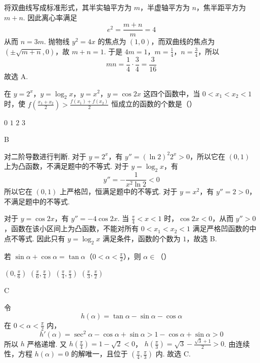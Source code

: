 \begin{solution}
将双曲线写成标准形式，其半实轴平方为 \(m\)，半虚轴平方为 \(n\)，焦半距平方为 \(m+n\). 因此离心率满足
\[
e^2=\frac{m+n}{m}=4
\]
从而 \(n=3m\). 抛物线 \(y^2=4x\) 的焦点为 \((1,0)\)，而双曲线的焦点为 \(\left(\pm\sqrt{m+n},0\right)\)，故 \(m+n=1\). 于是 \(4m=1\)，\(m=\frac14\)，\(n=\frac34\)，所以
\[
mn=\frac14\cdot\frac34=\frac{3}{16}
\]
故选 A.
\end{solution}

\begin{problem}
在 \( y = 2^x \)，\( y = \log_{2} x \)，\( y = x^2 \)，\( y = \cos 2x \) 这四个函数中，当 \( 0 < x_1 < x_2 < 1 \) 时，使 \( f\left(\frac{x_1 + x_2}{2}\right) > \frac{f(x_1) + f(x_2)}{2} \) 恒成立的函数的个数是（\quad）

\choices
    {\(0\)}
    {\(1\)}
    {\(2\)}
    {\(3\)}
\end{problem}

\begin{answer}
B
\end{answer}

\begin{solution}
对二阶导数进行判断. 对于 \(y=2^x\)，有 \(y''=(\ln2)^2 2^x>0\)，所以它在 \((0,1)\) 上为凸函数，不满足题中的不等式. 对于 \(y=\log_2x\)，有
\[
y''=-\frac{1}{x^2\ln2}<0
\]
所以它在 \((0,1)\) 上严格凹，恒满足题中的不等式. 对于 \(y=x^2\)，有 \(y''=2>0\)，不满足题中的不等式.

对于 \(y=\cos2x\)，有 \(y''=-4\cos2x\). 当 \(\frac{\pi}{4}<x<1\) 时，\(\cos2x<0\)，从而 \(y''>0\)，函数在该小区间上为凸函数，不能对所有 \(0<x_1<x_2<1\) 满足严格凹函数的中点不等式. 因此只有 \(y=\log_2x\) 满足条件，函数的个数为 \(1\)，故选 B.
\end{solution}

\begin{problem}
若 \(\sin \alpha + \cos \alpha = \tan \alpha\)（\(0 < \alpha < \frac{\pi}{2}\)），则 \(\alpha \in\)（\quad）

\choices
    {\(\left(0, \frac{\pi}{6}\right)\)}
    {\(\left(\frac{\pi}{6}, \frac{\pi}{4}\right)\)}
    {\(\left(\frac{\pi}{4}, \frac{\pi}{3}\right)\)}
    {\(\left(\frac{\pi}{3}, \frac{\pi}{2}\right)\)}
\end{problem}

\begin{answer}
C
\end{answer}

\begin{solution}
令
\[
h(\alpha)=\tan\alpha-\sin\alpha-\cos\alpha
\]
在 \(0<\alpha<\frac{\pi}{2}\) 内，
\[
h'(\alpha)=\sec^2\alpha-\cos\alpha+\sin\alpha>1-\cos\alpha+\sin\alpha>0
\]
所以 \(h\) 严格递增. 又 \(h\left(\frac{\pi}{4}\right)=1-\sqrt2<0\)，
\(h\left(\frac{\pi}{3}\right)=\sqrt3-\frac{\sqrt3+1}{2}>0\).
由连续性，方程 \(h(\alpha)=0\) 的解唯一，且位于 \(\left(\frac{\pi}{4},\frac{\pi}{3}\right)\) 内. 故选 C.
\end{solution}

